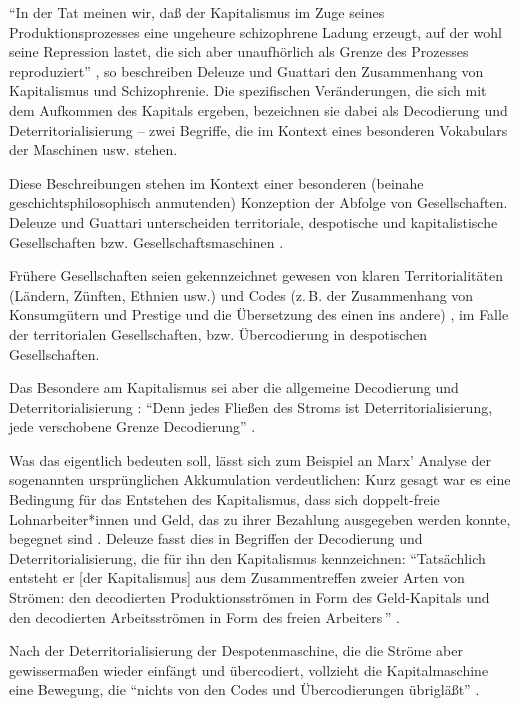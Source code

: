 \documentclass[12pt,
               DIV13,
               paper=a4,
               twoside=false,
               onehalfspacing,
               bibliography=totoc,
               toc=graduated,
               draft,
               ]{scrartcl}
\newcommand{\pc}[2]{\parencite[#1]{#2}}
\newcommand{\vgl}[2]{\parencite[vgl.][#1]{#2}}
\newcommand{\worries}[1]{\ifdraft{\textcolor{blue}{\texttt{(#1)}}}{}}
\begin{document}
"`In der Tat meinen wir, daß der Kapitalismus im Zuge seines
Produktionsprozesses eine ungeheure schizophrene Ladung erzeugt, auf
der wohl seine Repression lastet, die sich aber unaufhörlich als
Grenze des Prozesses reproduziert"' \pc{45}{ao}, so beschreiben
Deleuze und Guattari den Zusammenhang von Kapitalismus und
Schizophrenie. Die spezifischen Veränderungen, die sich mit dem
Aufkommen des Kapitals ergeben, bezeichnen sie dabei als Decodierung
und Deterritorialisierung -- zwei Begriffe, die im Kontext eines
besonderen Vokabulars der Maschinen usw. \worries{?} stehen.

Diese Beschreibungen stehen im Kontext einer besonderen (beinahe
geschichtsphilosophisch anmutenden) Konzeption der Abfolge von
Gesellschaften. Deleuze und Guattari unterscheiden territoriale,
despotische und kapitalistische Gesellschaften bzw.
Gesellschaftsmaschinen \vgl{338}{ao}.

Frühere Gesellschaften seien gekennzeichnet gewesen von
klaren Territorialitäten (Ländern, Zünften, Ethnien usw.) und Codes
(z.\,B. der Zusammenhang von Konsumgütern und Prestige und die
Übersetzung des einen ins andere) \vgl{318, 332}{ao}, im Falle der
territorialen Gesellschaften, bzw.
Übercodierung \worries{BSP} in despotischen Gesellschaften.

Das Besondere am Kapitalismus sei aber die allgemeine Decodierung und
Deterritorialisierung \vgl{337}{ao}: "`Denn jedes Fließen des Stroms
ist Deterritorialisierung, jede verschobene Grenze Decodierung"'
\pc{298}{ao}.

Was das eigentlich bedeuten soll, lässt sich zum Beispiel an Marx'
Analyse der sogenannten ursprünglichen Akkumulation verdeutlichen:
Kurz gesagt war es eine Bedingung für das Entstehen des Kapitalismus,
dass sich doppelt-freie Lohnarbeiter*innen und Geld, das zu ihrer
Bezahlung ausgegeben werden konnte, begegnet sind \vgl{xx}{kap}.
Deleuze fasst dies in Begriffen der Decodierung und
Deterritorialisierung, die für ihn den Kapitalismus kennzeichnen:
"`Tatsächlich entsteht er [der Kapitalismus] aus dem Zusammentreffen
zweier Arten von Strömen: den decodierten Produktionsströmen in Form
des Geld-Kapitals und den decodierten Arbeitsströmen in Form des \glq
freien Arbeiters\grq\,"' \pc{44}{ao}.

Nach der Deterritorialisierung der Despotenmaschine, die die Ströme
aber gewissermaßen wieder einfängt und übercodiert, vollzieht die
Kapitalmaschine eine Bewegung, die "`nichts von den Codes und
Übercodierungen übrigläßt"' \pc{337}{ao}.
\end{document}

